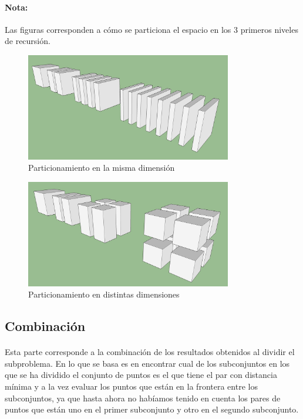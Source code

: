\documentclass{article}
\begin{document}
		\paragraph{Nota:}
		Las figuras corresponden a cómo se particiona el espacio en los 3 primeros niveles de recursión.

	\begin{figure}[H]
		\centering
		\includegraphics[width=90mm]{cube_division_1.jpg}
		\caption{Particionamiento en la misma dimensión \label{same_dim}}
	\end{figure}

	\begin{figure}[H]
		\centering
		\includegraphics[width=90mm]{cube_division_2.jpg}
		\caption{Particionamiento en distintas dimensiones \label{different_dim}}
	\end{figure}

	\subsection{Combinación}
		
		\paragraph{}
		Esta parte corresponde a la combinación de los resultados obtenidos al dividir el subproblema. En lo que se basa es en encontrar cual de los subconjuntos en los que se ha dividido el conjunto de puntos es el que tiene el par con distancia mínima y a la vez evaluar los puntos que están en la frontera entre los subconjuntos, ya que hasta ahora no habíamos tenido en cuenta los pares de puntos que están uno en el primer subconjunto y otro en el segundo subconjunto.
		
\end{document}

